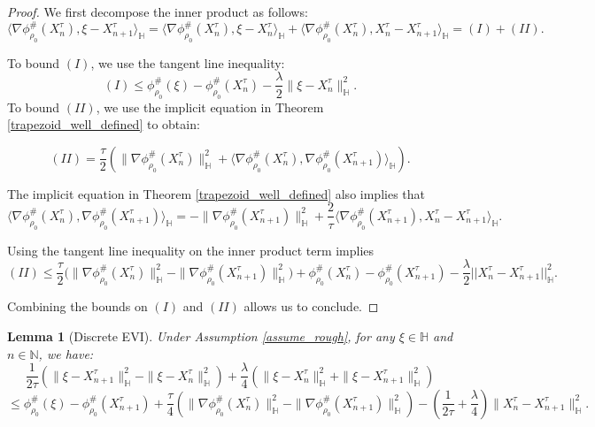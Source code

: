 \documentclass[11pt,a4paper]{amsart}
\newcommand{\1}{\mathds{1}}
\newtheorem{lemma}[theorem]{\textbf{Lemma}}
\numberwithin{equation}{section}
\begin{document}
\begin{proof} 
We first decompose the inner product as follows:
\begin{equation}
\langle \nabla \phi^{\#}_{\rho_0}(X_n^\tau), \xi - X_{n+1}^\tau \rangle_{\mathbb{H}}
= \langle \nabla \phi^{\#}_{\rho_0}(X_n^\tau), \xi - X_{n}^\tau \rangle_{\mathbb{H}} + \langle \nabla \phi^{\#}_{\rho_0}(X_n^\tau), X_{n}^\tau - X_{n+1}^\tau \rangle_{\mathbb{H}} = (I) + (II). \label{split_inner_product}
\end{equation}


\noindent To bound $(I)$, we use the tangent line inequality:
\[
(I)  \leq \phi^{\#}_{\rho_0}(\xi) - \phi^{\#}_{\rho_0}(X^{\tau}_n) -  \frac{\lambda}{2} \|\xi - X^{\tau}_n\|^2_{\mathbb{H}}.
\] 
To bound $(II)$, we use the implicit equation in Theorem \ref{trapezoid_well_defined} to obtain:


\[
(II) = \frac{\tau}{2} \left( \|\nabla \phi^{\#}_{\rho_0}(X^{\tau}_n)\|^2_{\mathbb{H}} 
+ \langle\nabla \phi^{\#}_{\rho_0}(X^{\tau}_n),\nabla \phi^{\#}_{\rho_0}(X^{\tau}_{n+1}) \rangle_{\mathbb{H}} \right).
\]

\noindent The implicit equation in Theorem \ref{trapezoid_well_defined} also implies that
\[
\langle\nabla \phi^{\#}_{\rho_0}(X^{\tau}_n),\nabla \phi^{\#}_{\rho_0}(X^{\tau}_{n+1}) \rangle_{\mathbb{H}} = 
    - \|\nabla \phi^{\#}_{\rho_0}(X^{\tau}_{n+1})\|^2_{\mathbb{H}} 
 + \frac{2}{\tau}\langle 
    \nabla \phi^{\#}_{\rho_0}(X^{\tau}_{n+1}), X^{\tau}_n - X^{\tau}_{n+1} 
\rangle_{\mathbb{H}}.
\]

\noindent Using the tangent line inequality on the inner product term implies
\[
(II) \leq \frac{\tau}{2} \big( 
    \|\nabla \phi^{\#}_{\rho_0}(X^{\tau}_n)\|^2_{\mathbb{H}} 
    - \|\nabla \phi^{\#}_{\rho_0}(X^{\tau}_{n+1})\|^2_{\mathbb{H}} 
\big) + \phi^{\#}_{\rho_0}(X^{\tau}_n) - \phi^{\#}_{\rho_0}(X^{\tau}_{n+1})  
- \frac{\lambda}{2} ||X^{\tau}_n- X^{\tau}_{n+1}||^2_{\mathbb{H}}.
\]

\noindent Combining the bounds on $(I)$ and $(II)$ allows us to conclude.
\end{proof}

\begin{lemma}[Discrete EVI] \label{discrete_EVI}
Under Assumption \ref{assume_rough}, for any $\xi \in \mathbb{H}$ and $n \in \mathbb{N}$, we have:
\[
\frac{1}{2 \tau} \left( \|\xi - X^{\tau}_{n+1}\|^2_{\mathbb{H}} - \|\xi - X^{\tau}_n\|^2_{\mathbb{H}} \right) 
+ \frac{\lambda}{4} \left(\|\xi - X^{\tau}_n\|^2_{\mathbb{H}} + \|\xi - X^{\tau}_{n+1}\|^2_{\mathbb{H}} \right)
\]
\[
\leq \phi^{\#}_{\rho_0}(\xi) - \phi^{\#}_{\rho_0}(X^{\tau}_{n+1}) 
+ \frac{\tau}{4} \left( \|\nabla \phi^{\#}_{\rho_0}(X_n^{\tau})\|^2_{\mathbb{H}} - \|\nabla \phi^{\#}_{\rho_0}(X^{\tau}_{n+1})\|^2_{\mathbb{H}} \right) 
- \left( \frac{1}{2 \tau} + \frac{\lambda}{4} \right) \|X^{\tau}_n - X^{\tau}_{n+1}\|^2_{\mathbb{H}}.
\]
\end{lemma}
\end{document}

